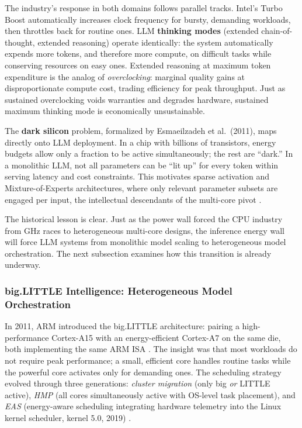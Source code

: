 The industry's response in both domains follows parallel tracks. Intel's Turbo Boost automatically increases clock frequency for bursty, demanding workloads, then throttles back for routine ones. LLM \textbf{thinking modes} (extended chain-of-thought, extended reasoning) operate identically: the system automatically expends more tokens, and therefore more compute, on difficult tasks while conserving resources on easy ones. Extended reasoning at maximum token expenditure is the analog of \textit{overclocking}: marginal quality gains at disproportionate compute cost, trading efficiency for peak throughput. Just as sustained overclocking voids warranties and degrades hardware, sustained maximum thinking mode is economically unsustainable.

The \textbf{dark silicon} problem, formalized by Esmaeilzadeh et al.\ (2011), maps directly onto LLM deployment. In a chip with billions of transistors, energy budgets allow only a fraction to be active simultaneously; the rest are ``dark.'' In a monolithic LLM, not all parameters can be ``lit up'' for every token within serving latency and cost constraints. This motivates sparse activation and Mixture-of-Experts architectures, where only relevant parameter subsets are engaged per input, the intellectual descendants of the multi-core pivot \cite{moore_1965, amdahl_1967}.

The historical lesson is clear. Just as the power wall forced the CPU industry from GHz races to heterogeneous multi-core designs, the inference energy wall will force LLM systems from monolithic model scaling to heterogeneous model orchestration. The next subsection examines how this transition is already underway.

\subsubsection{big.LITTLE Intelligence: Heterogeneous Model Orchestration}

In 2011, ARM introduced the big.LITTLE architecture: pairing a high-performance Cortex-A15 with an energy-efficient Cortex-A7 on the same die, both implementing the same ARM ISA \cite{biglittle_arm_2012}. The insight was that most workloads do not require peak performance; a small, efficient core handles routine tasks while the powerful core activates only for demanding ones. The scheduling strategy evolved through three generations: \textit{cluster migration} (only big \textit{or} LITTLE active), \textit{HMP} (all cores simultaneously active with OS-level task placement), and \textit{EAS} (energy-aware scheduling integrating hardware telemetry into the Linux kernel scheduler, kernel 5.0, 2019) \cite{eas_linux_2019}.

